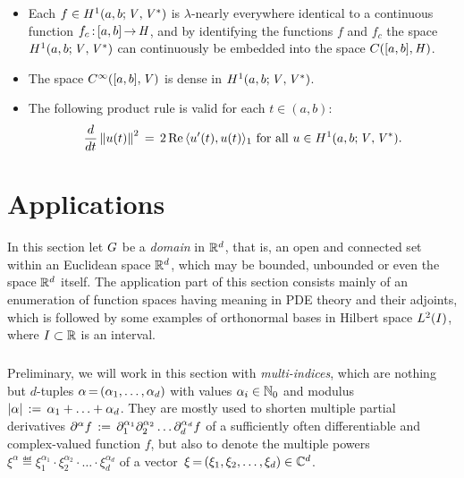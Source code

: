 \documentclass[11pt,twoside]{article}
\begin{document}
\begin{itemize}[leftmargin=7mm]
\item[(a)]
Each $f \in H^1(a,b;\mathit{V},\mathit{V}^*)$
is $\lambda$-nearly everywhere identical
to a continuous function $f_c{\,:\,}[a,b] {\,\to\,} \mathit{H}$,
and by identifying the functions $f$ and $f_c$
the space $H^1(a,b;\mathit{V},\mathit{V}^*)$ can continuously be embedded
into the space $C([a,b],\mathit{H})$.

\item[(b)]
The space $C^{\infty}([a,b],\mathit{V})$ is dense in $H^1(a,b;\mathit{V},\mathit{V}^*)$.

\item[(c)]
The following product rule is valid for each $t \in (a,b)$:
\[
\frac{d}{dt} \left\lVert u(t) \right\rVert ^2
\,=\,
2 \operatorname{Re} \, \langle u'(t),u(t) \rangle_1
\mbox{ for all } u \in H^1(a,b;\mathit{V},\mathit{V}^*).
\]
\end{itemize}

\section{Applications}                                                         %
In this section let $G$ be a \textit{domain} in ${\mathbb{R}}^d$,
that is,
an open and connected set within an Euclidean space ${\mathbb{R}}^d$,
which may be bounded, unbounded or even the space ${\mathbb{R}}^d$ itself.
The application part of this section consists mainly of an enumeration
of function spaces having meaning in PDE theory and their adjoints,
which is followed by some examples of orthonormal bases
in Hilbert space $L^2(I)$,
where $I \subset {\mathbb{R}}$ is an interval.

\subparagraph*{} %
Preliminary,
we will work in this section with \textit{multi-indices},
which are nothing but $d$-tuples
$\alpha {\,=\,} (\alpha_1,\ldots,\alpha_d)$
with values $\alpha_i \in {\mathbb{N}}_0$
and modulus $\abs{\alpha} \eqdef \alpha_1 + \ldots + \alpha_d$.
They are mostly used to shorten multiple partial derivatives
$
\partial^{\alpha} f \,:=\, \partial_1^{\alpha_1}
         \partial_2^{\alpha_2} \ldots
         \partial_d^{\alpha_d} f
$
of a sufficiently often differentiable and complex-valued function $f$,
but also to denote the multiple powers
$\xi^{\alpha} \eqdef \xi_1^{\alpha_1}
\cdot \xi_2^{\alpha_2} \cdot \ldots \cdot \xi_d^{\alpha_d}$
of a vector $\,\xi {\,=\,} (\xi_1,\xi_2,\ldots,\xi_d) \in {\mathbb{C}}^d$.
\end{document}

